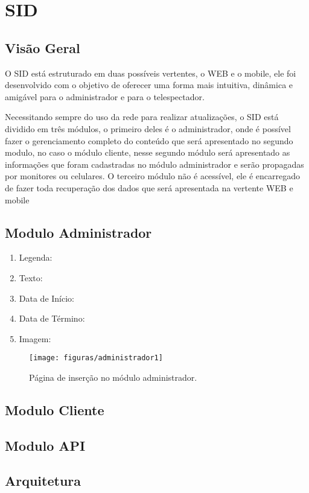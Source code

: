 \chapter[SID]{SID}
\section{Visão Geral}
O SID está estruturado em duas possíveis vertentes, o WEB e o mobile, ele foi
desenvolvido com o objetivo de oferecer uma forma mais intuitiva, dinâmica e amigável
para o administrador e para o telespectador.

Necessitando sempre do uso da rede para realizar atualizações, o SID está dividido
em três módulos, o primeiro deles é o administrador, onde é possível fazer o gerenciamento
completo do conteúdo que será apresentado no segundo modulo, no caso o módulo cliente,
nesse segundo módulo será apresentado as informações que foram cadastradas no módulo
administrador e serão propagadas por monitores ou celulares. O terceiro módulo não é
acessível, ele é encarregado de fazer toda recuperação dos dados que será apresentada na
vertente WEB e mobile

\section{Modulo Administrador}
 \begin{enumerate}
   \item Legenda: 
   \item Texto: 
   \item Data de Início:
   \item Data de Término:
   \item Imagem:
 \end{enumerate}
 
 \begin{figure}[!htb]
\centering
\texttt{[image: figuras/administrador1]}
\caption{Página de inserção no módulo administrador.}
\label{Rotulo}
\end{figure}

\section{Modulo Cliente}
\section{Modulo API}
\section{Arquitetura}

